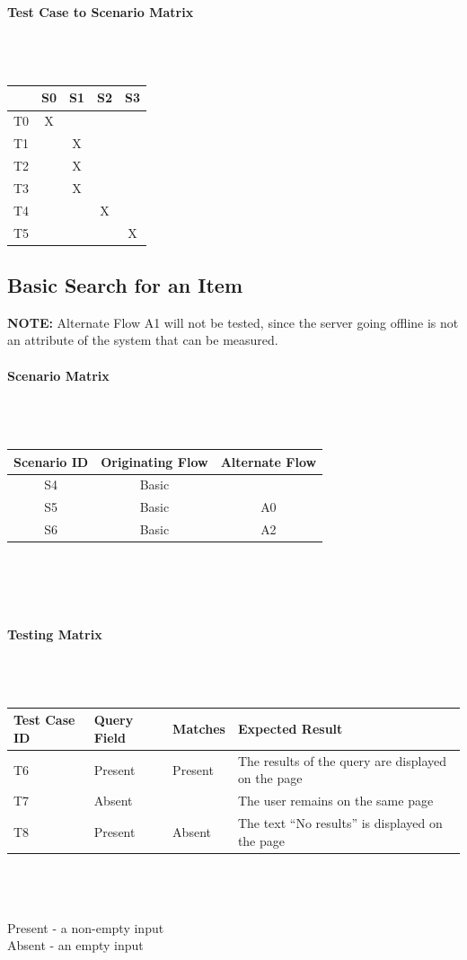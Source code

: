 \documentclass{article}
\begin{document}
\paragraph{Test Case to Scenario Matrix}~\\ \\
\begin{tabular}{ | c || c | c | c | c | }
\hline
   & S0 & S1 & S2 & S3 \\
\hline
\hline
T0 & X  &    &    &    \\
\hline
T1 &    & X  &    &    \\
\hline
T2 &    & X  &    &    \\
\hline
T3 &    & X  &    &    \\
\hline
T4 &    &    & X  &    \\
\hline
T5 &    &    &    & X  \\
\hline
\end{tabular}

\subsection{Basic Search for an Item}
\textbf{NOTE:} Alternate Flow A1 will not be tested, since the server going offline is not an attribute of the system that can be measured.

\paragraph{Scenario Matrix}~\\ \\
\begin{tabular}{ c  c  c }
\hline
Scenario ID & Originating Flow & Alternate Flow\\
\hline
\hline
S4 & Basic &  \\
\hline
S5 & Basic & A0 \\
\hline
S6 & Basic & A2 \\
\hline
\end{tabular}\\
~\\
~\\
\paragraph{Testing Matrix}~\\ \\
\begin{tabular}{ p{0.8in}  p{0.75in}  p{0.5in}  p{3in} }
\hline
Test Case ID & Query Field & Matches & Expected Result\\
\hline
\hline
T6 & Present & Present & The results of the query are displayed on the page\\
\hline
T7 & Absent & & The user remains on the same page\\
\hline
T8 & Present & Absent & The text ``No results'' is displayed on the page\\
\hline
\end{tabular}\\
~\\
~\\
Present - a non-empty input\\
Absent - an empty input
\end{document}

